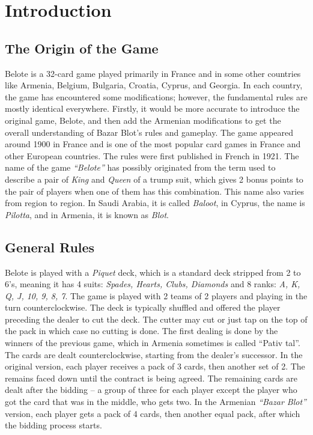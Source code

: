\section{Introduction}\label{GameIntro}\thispagestyle{SectionFirstPage} %
\subsection{The Origin of the Game}
\hspace{\parindent} Belote is a 32-card game played primarily in France and in some other countries like Armenia, Belgium, Bulgaria, Croatia, Cyprus, and Georgia.
In each country, the game has encountered some modifications; however, the fundamental rules are mostly identical everywhere.
Firstly, it would be more accurate to introduce the original game, Belote, and then add the Armenian modifications to get the overall understanding of Bazar Blot's rules and gameplay.
The game appeared around 1900 in France and is one of the most popular card games in France and other European countries.
The rules were first published in French in 1921.
The name of the game \textit{``Belote''} has possibly originated from the term used to describe a pair of \textit{King} and \textit{Queen} of a trump suit, which gives 2 bonus points to the pair of players when one of them has this combination.
This name also varies from region to region.
In Saudi Arabia, it is called \textit{Baloot}, in Cyprus, the name is \textit{Pilotta}, and in Armenia, it is known as \textit{Blot}.

\subsection{General Rules}
\hspace{\parindent} Belote is played with a \textit{Piquet} deck, which is a standard deck stripped from 2 to 6's, meaning it has 4 suits: \textit{Spades, Hearts, Clubs, Diamonds} and 8 ranks: \textit{A, K, Q, J, 10, 9, 8, 7}.
The game is played with 2 teams of 2 players and playing in the turn counterclockwise.
The deck is typically shuffled and offered the player preceding the dealer to cut the deck.
The cutter may cut or just tap on the top of the pack in which case no cutting is done.
The first dealing is done by the winners of the previous game, which in Armenia sometimes is called ``Pativ tal''.
The cards are dealt counterclockwise, starting from the dealer's successor.
In the original version, each player receives a pack of 3 cards, then another set of 2.
The remains faced down until the contract is being agreed.
The remaining cards are dealt after the bidding – a group of three for each player except the player who got the card that was in the middle, who gets two.
In the Armenian \textit{``Bazar Blot''} version, each player gets a pack of 4 cards, then another equal pack, after which the bidding process starts.

